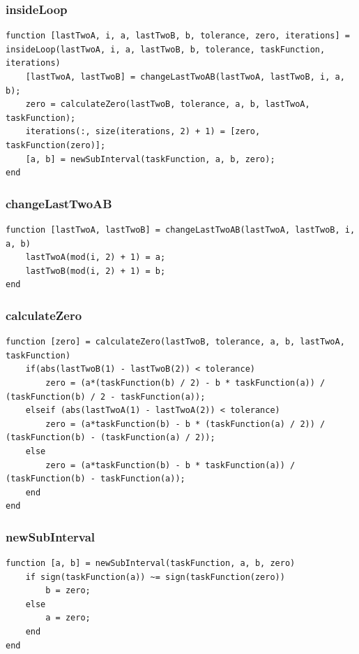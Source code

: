 \newpage
\subsubsection{insideLoop}
\begin{simplechar}
\begin{lstlisting}
function [lastTwoA, i, a, lastTwoB, b, tolerance, zero, iterations] = insideLoop(lastTwoA, i, a, lastTwoB, b, tolerance, taskFunction, iterations)
    [lastTwoA, lastTwoB] = changeLastTwoAB(lastTwoA, lastTwoB, i, a, b);
    zero = calculateZero(lastTwoB, tolerance, a, b, lastTwoA, taskFunction);
    iterations(:, size(iterations, 2) + 1) = [zero, taskFunction(zero)];
    [a, b] = newSubInterval(taskFunction, a, b, zero);
end
\end{lstlisting}
\end{simplechar}

\subsubsection{changeLastTwoAB}
\begin{simplechar}
\begin{lstlisting}
function [lastTwoA, lastTwoB] = changeLastTwoAB(lastTwoA, lastTwoB, i, a, b)
    lastTwoA(mod(i, 2) + 1) = a;
    lastTwoB(mod(i, 2) + 1) = b;
end
\end{lstlisting}
\end{simplechar}

\newpage
\subsubsection{calculateZero}
\begin{simplechar}
\begin{lstlisting}
function [zero] = calculateZero(lastTwoB, tolerance, a, b, lastTwoA, taskFunction)
    if(abs(lastTwoB(1) - lastTwoB(2)) < tolerance)
        zero = (a*(taskFunction(b) / 2) - b * taskFunction(a)) / (taskFunction(b) / 2 - taskFunction(a));
    elseif (abs(lastTwoA(1) - lastTwoA(2)) < tolerance)
        zero = (a*taskFunction(b) - b * (taskFunction(a) / 2)) / (taskFunction(b) - (taskFunction(a) / 2));
    else
        zero = (a*taskFunction(b) - b * taskFunction(a)) / (taskFunction(b) - taskFunction(a));
    end
end
\end{lstlisting}
\end{simplechar}

\subsubsection{newSubInterval}
\begin{simplechar}
\begin{lstlisting}
function [a, b] = newSubInterval(taskFunction, a, b, zero)
    if sign(taskFunction(a)) ~= sign(taskFunction(zero))
        b = zero;
    else
        a = zero;
    end
end

\end{lstlisting}
\end{simplechar}



